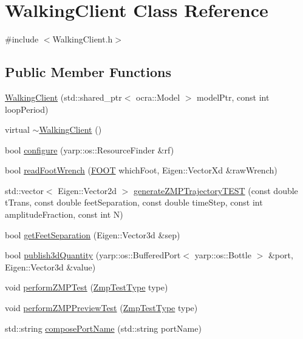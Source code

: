 \hypertarget{classWalkingClient}{\section{\-Walking\-Client \-Class \-Reference}
\label{classWalkingClient}
}


{\ttfamily \#include $<$\-Walking\-Client.\-h$>$}

\subsection*{\-Public \-Member \-Functions}
\begin{DoxyCompactItemize}
\item 
\hyperlink{classWalkingClient_a6c9002a44a54814c4b482739824e39aa}{\-Walking\-Client} (std\-::shared\-\_\-ptr$<$ ocra\-::\-Model $>$ model\-Ptr, const int loop\-Period)
\item 
virtual \hyperlink{classWalkingClient_a1dbc0308f844aea6542750104fddf8e2}{$\sim$\-Walking\-Client} ()
\item 
bool \hyperlink{classWalkingClient_adb8f972f34cb39c69c02a7c3cb493b81}{configure} (yarp\-::os\-::\-Resource\-Finder \&rf)
\item 
bool \hyperlink{classWalkingClient_a03ea2313c954a97aeb4d5b614f3e6caa}{read\-Foot\-Wrench} (\hyperlink{ZmpController_8h_a4b6a8e135f90bd56e5a57a60efb42529}{\-F\-O\-O\-T} which\-Foot, \-Eigen\-::\-Vector\-Xd \&raw\-Wrench)
\item 
std\-::vector$<$ \-Eigen\-::\-Vector2d $>$ \hyperlink{classWalkingClient_a3185a8ede8bf8b1227f7dd540ba87e3c}{generate\-Z\-M\-P\-Trajectory\-T\-E\-S\-T} (const double t\-Trans, const double feet\-Separation, const double time\-Step, const int amplitude\-Fraction, const int \-N)
\item 
bool \hyperlink{classWalkingClient_a87e70046251149b4b7aff1dc57b3dcc4}{get\-Feet\-Separation} (\-Eigen\-::\-Vector3d \&sep)
\item 
bool \hyperlink{classWalkingClient_ae6d6c046a9a3e51771afe8b4c105b412}{publish3d\-Quantity} (yarp\-::os\-::\-Buffered\-Port$<$ yarp\-::os\-::\-Bottle $>$ \&port, \-Eigen\-::\-Vector3d \&value)
\item 
void \hyperlink{classWalkingClient_ae3c259f7615c85ce53a413f6e7ab4b76}{perform\-Z\-M\-P\-Test} (\hyperlink{WalkingClient_8h_afc01479a47f5a87462a54b6a9e11fffa}{\-Zmp\-Test\-Type} type)
\item 
void \hyperlink{classWalkingClient_a3b1217b7fa17f76f162be0e12e419d96}{perform\-Z\-M\-P\-Preview\-Test} (\hyperlink{WalkingClient_8h_afc01479a47f5a87462a54b6a9e11fffa}{\-Zmp\-Test\-Type} type)
\item 
std\-::string \hyperlink{classWalkingClient_ae8f7dc629313df7d362e3edd6f45ae10}{compose\-Port\-Name} (std\-::string port\-Name)
\end{DoxyCompactItemize}
